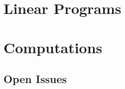 \documentclass[onecolumn]{newsiambook}
\begin{document}

    \part{Linear Programs}
    \label{part:lp}
    \label{part:lprelax}



    \part{Computations}
    \label{part:appendix}
    \chapter{Open Issues} %
    





\renewcommand\partname{Back Matter}
\renewcommand\chaptername{Appendix}


\backmatter



\printindex
\end{document}
